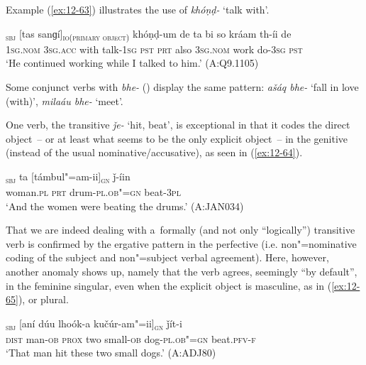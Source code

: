 Example (\ref{ex:12-63}) illustrates the use of \textit{khóṇḍ-} `talk with'.

\begin{exe}
\ex
\label{ex:12-63}
\gll [ma]\textsubscript{\textsc{sbj}} [tas sanɡí]\textsubscript{\textsc{io(primary object)}} khóṇḍ-um de ta bi so kráam th-íi de \\
\textsc{1sg.nom} \textsc{3sg.acc} with talk-\textsc{1sg} \textsc{pst}  \textsc{prt} also \textsc{3sg.nom} work do-\textsc{3sg} \textsc{pst} \\
\glt `He continued working while I talked to him.' (A:Q9.1105)
\end{exe}

Some conjunct verbs with \textit{bhe-} () display the same pattern: \textit{ašáq bhe-} `fall in love (with)', \textit{milaáu bhe-} `meet'.


 One verb, the transitive \textit{ǰe-} `hit, beat', is exceptional in that it codes the direct object~-- or at least what seems to be the only explicit object~-- in the genitive (instead of the usual nominative/accusative), as seen in (\ref{ex:12-64}).

\begin{exe}
\ex
\label{ex:12-64}
\gll [kuṛíina]\textsubscript{\textsc{sbj}} ta [támbul"=am-ii]\textsubscript{\textsc{gn}} ǰ-íin  \\
woman.\textsc{pl} \textsc{prt} drum-\textsc{pl.ob"=gn} beat-\textsc{3pl}  \\
\glt `And the women were beating the drums.' (A:JAN034)
\end{exe}

That we are indeed dealing with a~formally (and not only ``logically'') transitive verb is confirmed by the ergative pattern in the perfective (i.e. non"=nominative coding of the subject and non"=subject verbal agreement). Here, however, another anomaly shows up, namely that the verb agrees, seemingly ``by default'', in the feminine singular, even when the explicit object is masculine, as in (\ref{ex:12-65}), or plural.

\begin{exe}
\ex
\label{ex:12-65}
\textsubscript{\textsc{sbj}} [aní dúu lhoók-a kučúr-am"=ii]\textsubscript{\textsc{gn}} ǰít-i \\
\textsc{dist} man-\textsc{ob} \textsc{prox} two small-\textsc{ob} dog-\textsc{pl.ob"=gn} beat.\textsc{pfv-f} \\
\glt `That man hit these two small dogs.' (A:ADJ80)
\end{exe}

